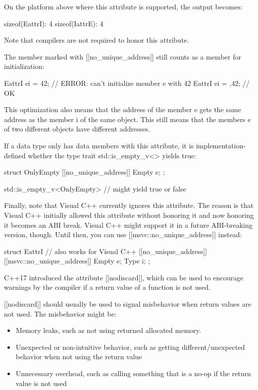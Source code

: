 On the platform above where this attribute is supported, the output becomes:

\begin{shell}
sizeof(EattrI): 4
sizeof(IattrE): 4
\end{shell}

Note that compilers are not required to honor this attribute.

The member marked with [[no\_unique\_address]] still counts as a member for initialization:

\begin{cpp}
EattrI ei = {42}; // ERROR: can’t initialize member e with 42
EattrI ei = {{},42}; // OK
\end{cpp}

This optimization also means that the address of the member e gets the same address as the member i of the same object. This still means that the members e of two different objects have different addresses.

If a data type only has data members with this attribute, it is implementation-defined whether the type trait std::is\_empty\_v<> yields true:

\begin{cpp}
struct OnlyEmpty {
	[[no_unique_address]] Empty e;
};

std::is_empty_v<OnlyEmpty> // might yield true or false
\end{cpp}

Finally, note that Visual C++ currently ignores this attribute. The reason is that Visual C++ initially allowed this attribute without honoring it and now honoring it becomes an ABI break. Visual C++ might support it in a future ABI-breaking version, though. Until then, you can use [[msvc::no\_unique\_address]] instead:

\begin{cpp}
struct EattrI { // also works for Visual C++
	[[no_unique_address]] [[msvc::no_unique_address]] Empty e;
	Type i;
};
\end{cpp}


C++17 introduced the attribute [[nodiscard]], which can be used to encourage warnings by the compiler if a return value of a function is not used.

[[nodiscard]] should usually be used to signal misbehavior when return values are not used. The misbehavior might be:

\begin{itemize}
\item 
Memory leaks, such as not using returned allocated memory.

\item 
Unexpected or non-intuitive behavior, such as getting different/unexpected behavior when not using the return value

\item 
Unnecessary overhead, such as calling something that is a no-op if the return value is not used
\end{itemize}

